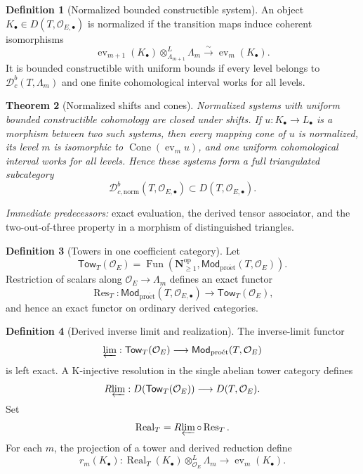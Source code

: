 \documentclass[10pt]{article}
\newtheorem{theorem}{Theorem}[section]
\theoremstyle{definition}
\newtheorem{definition}[theorem]{Definition}
\newcommand{\Dbc}{\mathcal D^b_c}
\newcommand{\Dbcnorm}{\mathcal D^b_{c,\mathrm{norm}}}
\newcommand{\Mod}{\mathsf{Mod}}
\newcommand{\pred}[1]{\par\smallskip\begingroup\footnotesize\raggedright
\emph{Immediate predecessors:} #1.\par\endgroup}
\begin{document}
\begin{definition}[Normalized bounded constructible system]
An object \(K_\bullet\in D(T,\mathcal O_{E,\bullet})\) is normalized if the
transition maps induce coherent isomorphisms
\[
 \operatorname{ev}_{m+1}(K_\bullet)
 \otimes^L_{\Lambda_{m+1}}\Lambda_m
 \xrightarrow{\sim}\operatorname{ev}_m(K_\bullet).
\]
It is bounded constructible with uniform bounds if every level belongs to
\(\Dbc(T,\Lambda_m)\) and one finite cohomological interval works for all
levels.
\end{definition}

\begin{theorem}[Normalized shifts and cones]
Normalized systems with uniform bounded constructible cohomology are closed
under shifts.  If \(u:K_\bullet\to L_\bullet\) is a morphism between two such
systems, then every mapping cone of \(u\) is normalized, its level \(m\) is
isomorphic to
\(\operatorname{Cone}(\operatorname{ev}_m u)\), and one uniform
cohomological interval works for all levels.  Hence these systems form a
full triangulated subcategory
\[
 \Dbcnorm(T,\mathcal O_{E,\bullet})
 \subset D(T,\mathcal O_{E,\bullet}).
\]
\end{theorem}
\pred{exact evaluation, the derived tensor associator, and the two-out-of-three property in a morphism of distinguished triangles}

\begin{definition}[Towers in one coefficient category]
Let
\[
 \mathsf{Tow}_T(\mathcal O_E)=
 \operatorname{Fun}(\mathbf N_{\ge1}^{\mathrm{op}},
                    \Mod_{\mathrm{pro\acute et}}(T,\mathcal O_E)).
\]
Restriction of scalars along
\(\mathcal O_E\to\Lambda_m\) defines an exact functor
\[
 \operatorname{Res}_T:
 \Mod_{\mathrm{pro\acute et}}(T,\mathcal O_{E,\bullet})
 \longrightarrow\mathsf{Tow}_T(\mathcal O_E),
\]
and hence an exact functor on ordinary derived categories.
\end{definition}

\begin{definition}[Derived inverse limit and realization]
The inverse-limit functor
\[
 \varprojlim:\mathsf{Tow}_T(\mathcal O_E)
 \longrightarrow\Mod_{\mathrm{pro\acute et}}(T,\mathcal O_E)
\]
is left exact.  A K-injective resolution in the single abelian tower
category defines
\[
 R\!\varprojlim:
 D(\mathsf{Tow}_T(\mathcal O_E))
 \longrightarrow D(T,\mathcal O_E).
\]
Set
\[
 \operatorname{Real}_T=
 R\!\varprojlim\circ\operatorname{Res}_T.
\]
For each \(m\), the projection of a tower and derived reduction define
\[
 r_m(K_\bullet):
 \operatorname{Real}_T(K_\bullet)
 \otimes^L_{\mathcal O_E}\Lambda_m
 \longrightarrow\operatorname{ev}_m(K_\bullet).
\]
\end{definition}
\end{document}
